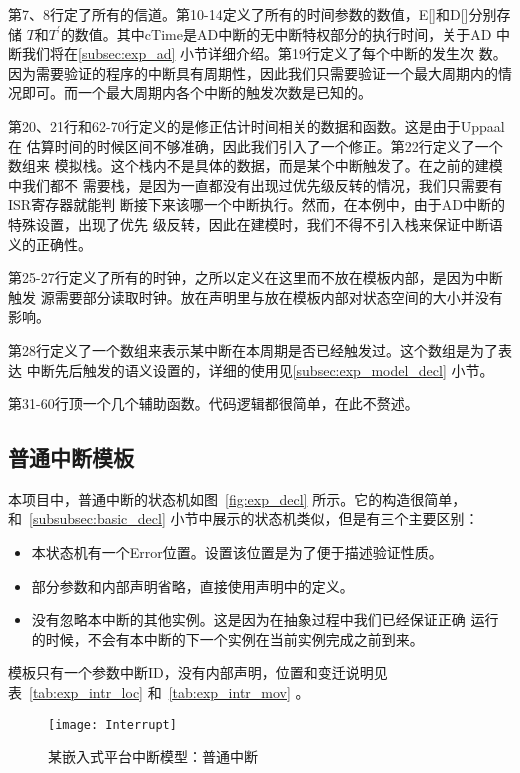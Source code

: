 第7、8行定了所有的信道。第10-14定义了所有的时间参数的数值，E[]和D[]分别存储
$T$和$T^\prime$的数值。其中cTime是AD中断的无中断特权部分的执行时间，关于AD
中断我们将在\ref{subsec:exp_ad} 小节详细介绍。第19行定义了每个中断的发生次
数。因为需要验证的程序的中断具有周期性，因此我们只需要验证一个最大周期内的情
况即可。而一个最大周期内各个中断的触发次数是已知的。

第20、21行和62-70行定义的是修正估计时间相关的数据和函数。这是由于Uppaal在
估算时间的时候区间不够准确，因此我们引入了一个修正。第22行定义了一个数组来
模拟栈。这个栈内不是具体的数据，而是某个中断触发了。在之前的建模中我们都不
需要栈，是因为一直都没有出现过优先级反转的情况，我们只需要有ISR寄存器就能判
断接下来该哪一个中断执行。然而，在本例中，由于AD中断的特殊设置，出现了优先
级反转，因此在建模时，我们不得不引入栈来保证中断语义的正确性。

第25-27行定义了所有的时钟，之所以定义在这里而不放在模板内部，是因为中断触发
源需要部分读取时钟。放在声明里与放在模板内部对状态空间的大小并没有影响。

第28行定义了一个数组来表示某中断在本周期是否已经触发过。这个数组是为了表达
中断先后触发的语义设置的，详细的使用见\ref{subsec:exp_model_decl} 小节。

第31-60行顶一个几个辅助函数。代码逻辑都很简单，在此不赘述。

\subsection{普通中断模板}
\label{subsec:exp_intr}

本项目中，普通中断的状态机如图~\ref{fig:exp_decl} 所示。它的构造很简单，
和~\ref{subsubsec:basic_decl} 小节中展示的状态机类似，但是有三个主要区别：

\begin{itemize}
	\item 本状态机有一个Error位置。设置该位置是为了便于描述验证性质。
	\item 部分参数和内部声明省略，直接使用声明中的定义。
	\item 没有忽略本中断的其他实例。这是因为在抽象过程中我们已经保证正确
	运行的时候，不会有本中断的下一个实例在当前实例完成之前到来。
\end{itemize}

模板只有一个参数\pozhehao 中断ID，没有内部声明，位置和变迁说明见
表~\ref{tab:exp_intr_loc} 和~\ref{tab:exp_intr_mov} 。

\begin{figure}[H]
	\centering
	\texttt{[image: Interrupt]}
	\caption{某嵌入式平台中断模型：普通中断}
	\label{fig:exp_intr}
\end{figure}

